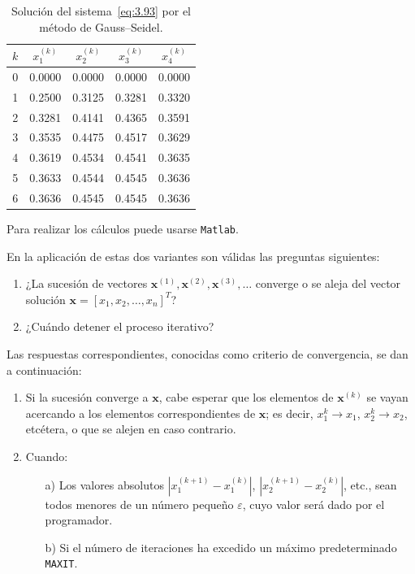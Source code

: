 \documentclass[12pt,letterpaper]{article}
\theoremstyle{definition}
\theoremstyle{plain}
\theoremstyle{remark}
\begin{document}
\begin{table}[h!]
\centering
\caption{Solución del sistema~\eqref{eq:3.93} por el método de Gauss–Seidel.}
\begin{tabular}{c|c c c c}
$k$ & $x_1^{(k)}$ & $x_2^{(k)}$ & $x_3^{(k)}$ & $x_4^{(k)}$ \\
\hline
0 & 0.0000 & 0.0000 & 0.0000 & 0.0000 \\
1 & 0.2500 & 0.3125 & 0.3281 & 0.3320 \\
2 & 0.3281 & 0.4141 & 0.4365 & 0.3591 \\
3 & 0.3535 & 0.4475 & 0.4517 & 0.3629 \\
4 & 0.3619 & 0.4534 & 0.4541 & 0.3635 \\
5 & 0.3633 & 0.4544 & 0.4545 & 0.3636 \\
6 & 0.3636 & 0.4545 & 0.4545 & 0.3636
\end{tabular}
\end{table}

\noindent
Para realizar los cálculos puede usarse \texttt{Matlab}.



En la aplicación de estas dos variantes son válidas las preguntas siguientes:

\begin{enumerate}
    \item ¿La sucesión de vectores $\mathbf{x}^{(1)}, \mathbf{x}^{(2)}, \mathbf{x}^{(3)}, \ldots$ converge o se aleja del vector solución $\mathbf{x} = [x_1, x_2, \ldots, x_n]^T$?
    \item ¿Cuándo detener el proceso iterativo?
\end{enumerate}

Las respuestas correspondientes, conocidas como criterio de convergencia, se dan a continuación:

\begin{enumerate}
    \item Si la sucesión converge a $\mathbf{x}$, cabe esperar que los elementos de $\mathbf{x}^{(k)}$ se vayan acercando a los elementos correspondientes de $\mathbf{x}$; es decir, $x_1^{k} \to x_1$, $x_2^{k} \to x_2$, etcétera, o que se alejen en caso contrario.
    \item Cuando:
    \begin{enumerate}
        \item[a)] Los valores absolutos $|x_1^{(k+1)} - x_1^{(k)}|$, $|x_2^{(k+1)} - x_2^{(k)}|$, etc., sean todos menores de un número pequeño $\varepsilon$, cuyo valor será dado por el programador.
        \item[b)] Si el número de iteraciones ha excedido un máximo predeterminado \texttt{MAXIT}.
    \end{enumerate}
\end{enumerate}
\end{document}

